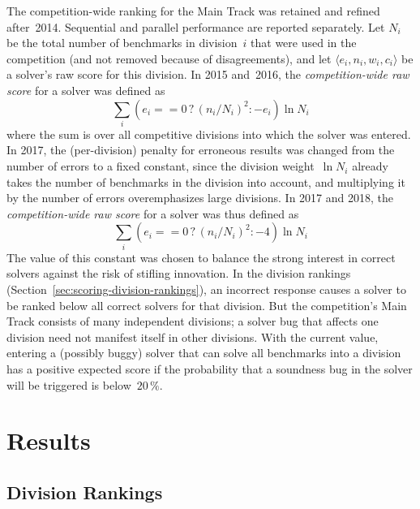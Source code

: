 \documentclass[dvipsnames,table,twoside,11pt]{article}
\newcommand{\maintrack}{Main Track\xspace}
\begin{document}
The competition-wide ranking for the \maintrack was retained and
refined after~2014.  Sequential and parallel performance are reported
separately.  Let $N_i$ be the total number of benchmarks in
division~$i$ that were used in the competition (and not removed
because of disagreements), and let $\langle e_i, n_i, w_i, c_i\rangle$
be a solver's raw score for this division.
%
In 2015 and~2016, the \emph{competition-wide raw score} for a solver
was defined as
%
$$\sum_i (e_i == 0 \,?\, (n_i/N_i)^2 : -e_i) \ln N_i$$
%
where the sum is over all competitive divisions into which the solver
was entered.
%
In 2017, the (per-division) penalty for erroneous results was changed
from the number of errors to a fixed constant, since the division
weight~$\ln N_i$ already takes the number of benchmarks in the
division into account, and multiplying it by the number of errors
overemphasizes large divisions.  In 2017 and 2018, the
\emph{competition-wide raw score} for a solver was thus defined as
%
$$\sum_i (e_i == 0 \,?\, (n_i/N_i)^2 : -4) \ln N_i$$
%
The value of this constant was chosen to balance the strong interest
in correct solvers against the risk of stifling innovation.  In the
division rankings (Section~\ref{sec:scoring-division-rankings}), an
incorrect response causes a solver to be ranked below all correct
solvers for that division.  But the competition's \maintrack consists
of many independent divisions; a solver bug that affects one division
need not manifest itself in other divisions.  With the current value,
entering a (possibly buggy) solver that can solve all benchmarks into
a division has a positive expected score if the probability that a
soundness bug in the solver will be triggered is below~$20\,\%$.


\section{Results}
\label{sec:results}

\subsection{Division Rankings}
\label{sec:division-rankings}
\end{document}
